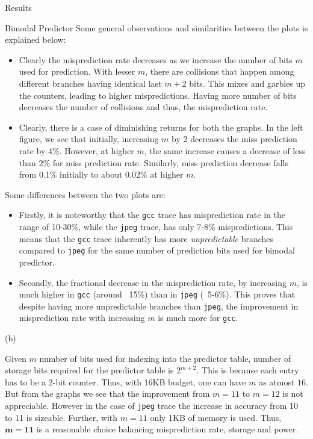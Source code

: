 \begin{section}{Results}
\begin{subsection}{Bimodal Predictor}
        Some general observations and similarities between the plots is explained below:
        \begin{itemize}
            \item Clearly the misprediction rate decreases as we increase the number of bits $m$ used for prediction. With lesser $m$, there are collisions that happen among different branches having identical last $m+2$ bits. This mixes and garbles up the counters, leading to higher mispredictions. Having more number of bits decreases the number of collisions and thus, the misprediction rate.
            \item Clearly, there is a case of diminishing returns for both the graphs. In the left figure, we see that initially, increasing $m$ by 2 decreases the miss prediction rate by 4\%. However, at higher $m$, the same increase causes a decrease of less than 2\% for miss prediction rate. Similarly, miss prediction decrease falls from 0.1\% initially to about 0.02\% at higher $m$.   %
        \end{itemize}

        Some differences between the two plots are:
        \begin{itemize}
            \item Firstly, it is noteworthy that the \texttt{gcc} trace has misprediction rate in the range of 10-30\%, while the \texttt{jpeg} trace, has only 7-8\% mispredictions. This means that the \texttt{gcc} trace inherently has more \textit{unpredictable} branches compared to \texttt{jpeg} for the same number of prediction bits used for bimodal predictor. 
            \item Secondly, the fractional decrease in the misprediction rate, by increasing $m$, is much higher in \texttt{gcc} (around ~15\%) than in \texttt{jpeg} (~5-6\%). This proves that despite having more unpredictable branches than \texttt{jpeg}, the improvement in misprediction rate with increasing $m$ is much more for \texttt{gcc}. 
        \end{itemize}

        \begin{center}
            (b) 
        \end{center}
        Given $m$ number of bits used for indexing into the predictor table, number of storage bits required for the predictor table is $2^{m+2}$. This is because each entry has to be a 2-bit counter. Thus, with 16KB budget, one can have $m$ as atmost $16$. But from the graphs we see that the improvement from $m=11$ to $m=12$ is not appreciable. However in the case of \texttt{jpeg} trace the increase in accuracy from 10 to 11 is sizeable. Further, with $m=11$ only 1KB of memory is used. Thus, $\mathbf{m=11}$ is a reasonable choice balancing misprediction rate, storage and power.
    \end{subsection}


\end{section}
